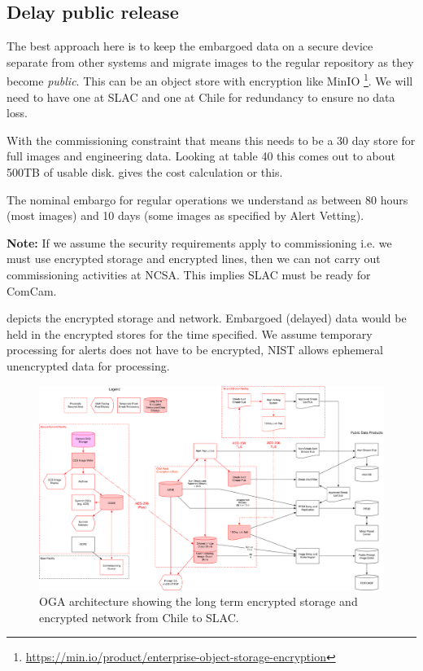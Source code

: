 
\subsection{Delay public release} \label{sec:3delay}

The best approach here is to keep the embargoed data on a secure device separate from other systems and migrate images to the regular repository as they become \emph{public}.
This can be an object store with encryption like MinIO \footnote{\url{ https://min.io/product/enterprise-object-storage-encryption}}.
We will need to have one at SLAC and one at Chile for redundancy to ensure no data loss.

With the commissioning constraint that means this needs to be a 30 day store  for full images and engineering data.
Looking at 
table 40 this comes out to about 500TB of usable disk.
 gives the cost calculation or this.

The nominal embargo for regular operations we understand as between 80 hours (most images) and 10 days (some images as specified by Alert Vetting).




{\bf Note:} If we assume the security requirements apply to commissioning i.e. we must use encrypted storage and encrypted lines, then we can not carry out commissioning activities at NCSA. This implies SLAC must be ready for ComCam.

 depicts the encrypted storage and network. Embargoed (delayed) data would be held in the encrypted stores for the time specified.
We assume temporary processing for alerts does not have to be encrypted, NIST allows ephemeral unencrypted data for processing.

\begin{figure}
\begin{centering}
\includegraphics[width=\textwidth]{OGA_Diagram}
	\caption{ OGA architecture  showing the long term encrypted storage and encrypted network from Chile to SLAC. \label{fig:arch}}
\end{centering}
\end{figure}
